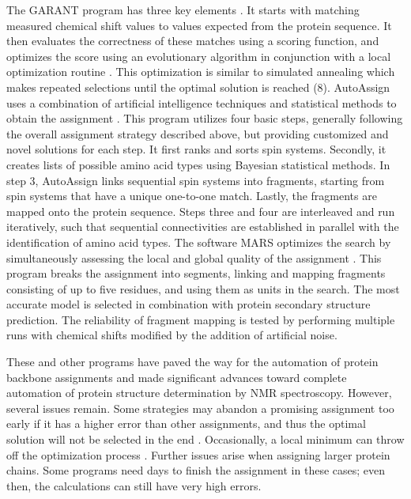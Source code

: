 \documentclass{article}
\begin{document}
The GARANT program has three key elements \cite{garant}. It starts with matching measured chemical shift values to values expected from the protein sequence. It then evaluates the correctness of  these matches using a scoring function, and optimizes the score using an evolutionary algorithm in conjunction with a local optimization routine \cite{guntert}. This optimization is similar to simulated annealing which makes repeated selections until the optimal solution is reached (8). AutoAssign uses a combination of artificial intelligence techniques and statistical methods to obtain the assignment \cite{james} . This program utilizes four basic steps, generally following the overall assignment strategy described above, but providing customized and novel solutions for each step. It first ranks and sorts spin systems. Secondly, it creates lists of possible amino acid types using Bayesian statistical methods. In step 3, AutoAssign links sequential spin systems into fragments, starting from spin systems that have a unique one-to-one match. Lastly, the fragments are mapped onto the protein sequence. Steps three and four are interleaved and run iteratively, such that sequential connectivities are established in parallel with  the identification of amino acid types. The software MARS optimizes the search by simultaneously assessing the local and global quality of the assignment \cite{mars}. This program breaks the assignment into segments, linking and mapping fragments consisting of up to five residues, and using them as units in the search. The most accurate model is selected in combination with protein secondary structure prediction. The reliability of fragment mapping is tested by performing multiple runs with chemical shifts modified by the addition of artificial noise.

These and other programs have paved the way for the automation of protein backbone assignments and made significant advances toward complete automation of protein structure determination by NMR spectroscopy. However, several issues remain. Some strategies may abandon a promising assignment too early if it has a higher error than other assignments, and thus the optimal solution will not be selected in the end \cite{mars}. Occasionally, a local minimum can throw off the optimization process \cite{mars}. Further issues arise when assigning larger protein chains. Some programs need days to finish the assignment in these cases; even then, the calculations can still have very high errors. 
\end{document}
